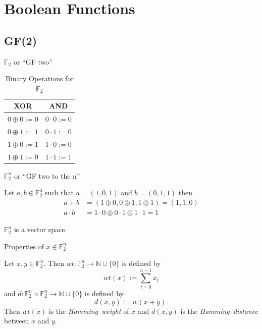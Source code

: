 \documentclass{beamer}
\def\gftwo{\mathbb{F}_2}
\def\nnn{\mathbb{N}}
\begin{document}
\section{Boolean Functions}
\subsection{GF(2)}
\begin{frame}{$\gftwo$ or ``GF two''}
  \begin{table}[h!]\label{tab:GF(2)}
    \centering
    \begin{tabular}{|c|c|}
      \hline
      XOR&AND\\
      \hline
      $0\oplus0:=0$&$0\cdot0:=0$\\
      $0\oplus1:=1$&$0\cdot1:=0$\\
      $1\oplus0:=1$&$1\cdot0:=0$\\
      $1\oplus1:=0$&$1\cdot1:=1$\\
      \hline
    \end{tabular}
  \caption{Binary Operations for $\gftwo$}
  \end{table}
\end{frame}

\begin{frame}{$\gftwo^n$ or ``GF two to the n''}
\begin{example}
  Let $a,b\in\gftwo^3$ such that $a=(1,0,1)$ and $b=(0,1,1)$ then
  \begin{align*}
    a+b      &=(1\oplus0,0\oplus1,1\oplus1)=(1,1,0) \\
  a\cdot b &=1\cdot0\oplus0\cdot1\oplus1\cdot1=1
  \end{align*}
\end{example}

\begin{fact}
  $\gftwo^n$ is a vector space.
\end{fact}
\end{frame}

\begin{frame}{Properties of $x\in\gftwo^n$}
  \begin{definition}
  \label{def:Hamming}
  	Let $x,y\in\gftwo^n$. Then $wt:\gftwo^n\rightarrow\nnn\cup\{0\}$
    is defined by
  	\[
  	  wt(x):=\sum_{i=0}^{n-1}x_i
  	\]
  	and $d:\gftwo^n\times\gftwo^n\rightarrow\nnn\cup\{0\}$ is defined by
  	\[
  	  d(x,y):=w(x+y).
  	\]
  	Then $wt(x)$ is the {\em Hamming\ weight} of $x$ and $d(x,y)$ is the
  	{\em Hamming\ distance} between $x$ and $y$.
  \end{definition}
\end{frame}
  
\end{document}

